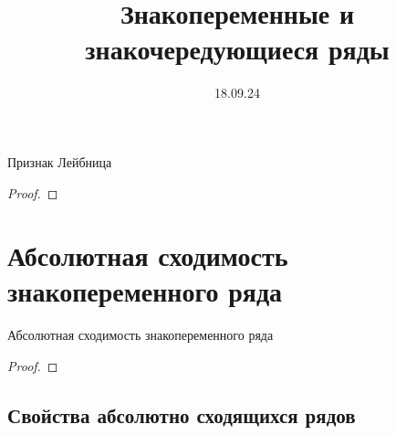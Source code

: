 

\title{Знакопеременные и знакочередующиеся ряды}
\date{18.09.24}


\maketitle

\begin{theorem}
    Признак Лейбница\\

    \begin{proof}
        
    \end{proof}

    \begin{corollary}
        
    \end{corollary}
\end{theorem}



\section{Абсолютная сходимость знакопеременного ряда}
\begin{theorem}
    Абсолютная сходимость знакопеременного ряда\\

    \begin{proof}
        
    \end{proof}
\end{theorem}

\subsection{Свойства абсолютно сходящихся рядов}
